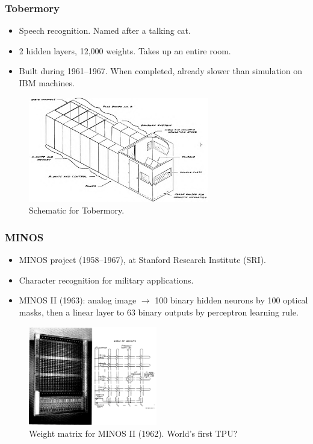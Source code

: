 \documentclass{beamer}
\begin{document}
\begin{frame}
    \frametitle{Tobermory}
    \begin{itemize}
        \item Speech recognition. Named after a talking cat.
        \item 2 hidden layers, 12,000 weights. Takes up an entire room.
        \item Built during 1961--1967. When completed, already slower than simulation on IBM machines.
    \end{itemize}
    \begin{figure}[t]
        \includegraphics[width=0.7\textwidth]{figure/Tobermory.png}
        \centering
        \caption{Schematic for Tobermory.}
    \end{figure}  
\end{frame}

\begin{frame}
\frametitle{MINOS}

\begin{itemize}
    \item MINOS project (1958--1967), at Stanford Research Institute (SRI).
    \item Character recognition for military applications.
    \item MINOS II (1963): analog image $\to$ 100 binary hidden neurons by 100 optical masks, then a linear layer to 63 binary outputs by perceptron learning rule.
\end{itemize}

\begin{figure}[t]
    \includegraphics[width=0.5\textwidth]{figure/MINOS_II.png}
    \centering
    \caption{Weight matrix for MINOS II (1962). World's first TPU?}
\end{figure}
    
\end{frame}
\end{document}
